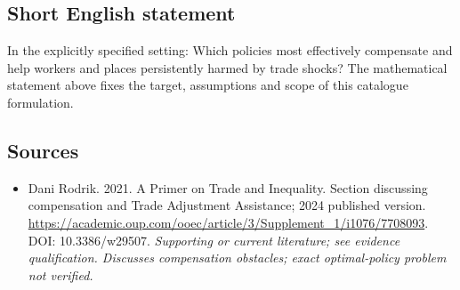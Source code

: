 \documentclass[11pt]{article}
\begin{document}
\subsection{Short English statement}
In the explicitly specified setting: Which policies most effectively compensate and help workers and places persistently harmed by trade shocks? The mathematical statement above fixes the target, assumptions and scope of this catalogue formulation.

\subsection{Sources}
\begin{itemize}\raggedright
\item[\textnormal{[S1]}]\hypertarget{source:30007623:1}{} Dani Rodrik. 2021. A Primer on Trade and Inequality. Section discussing compensation and Trade Adjustment Assistance; 2024 published version.
\url{https://academic.oup.com/ooec/article/3/Supplement_1/i1076/7708093}.
DOI: 10.3386/w29507.
{\small\textit{Supporting or current literature; see evidence qualification. Discusses compensation obstacles; exact optimal-policy problem not verified.}}
\end{itemize}
\end{document}
